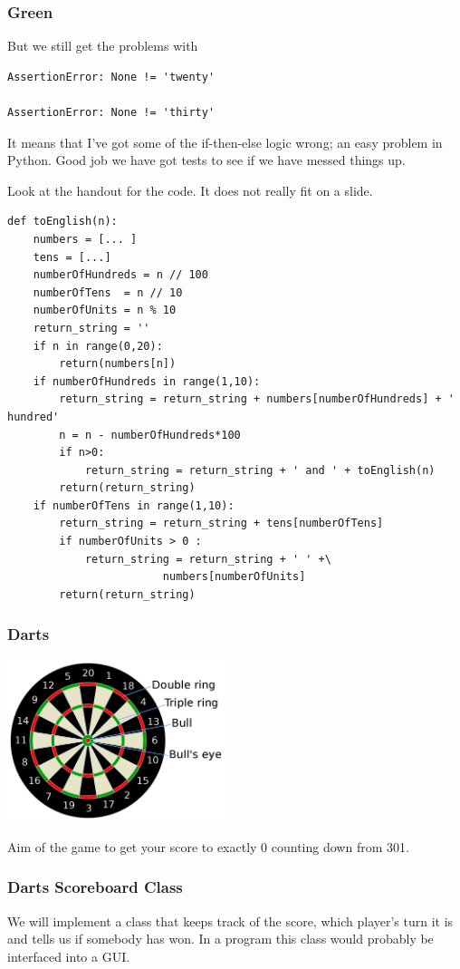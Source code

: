 \documentclass{beamer}
\begin{document}
\begin{frame}[fragile]
  \frametitle{Green}
But we still get the problems with 
\begin{verbatim}
AssertionError: None != 'twenty'

AssertionError: None != 'thirty'
\end{verbatim}
It means that I've got some of the if-then-else logic wrong; an easy
problem in Python. Good job we have got tests to see if we have messed
things up.

Look at the handout for the code. It does not really  fit on a slide.
\end{frame}
\begin{frame}[fragile]
  \begin{lstlisting}[basicstyle=\fontsize{8}{9}\selectfont]
def toEnglish(n):
    numbers = [... ] 
    tens = [...]
    numberOfHundreds = n // 100
    numberOfTens  = n // 10
    numberOfUnits = n % 10
    return_string = ''
    if n in range(0,20):
        return(numbers[n])
    if numberOfHundreds in range(1,10):
        return_string = return_string + numbers[numberOfHundreds] + ' hundred'
        n = n - numberOfHundreds*100
        if n>0:
            return_string = return_string + ' and ' + toEnglish(n)
        return(return_string)
    if numberOfTens in range(1,10):
        return_string = return_string + tens[numberOfTens]
        if numberOfUnits > 0 :
            return_string = return_string + ' ' +\ 
            			numbers[numberOfUnits]
        return(return_string)
  \end{lstlisting}
\end{frame}
\begin{frame}
\frametitle{Darts}

\begin{center}
    \includegraphics[height=1.86in,width=2.5in]{board.png}
\end{center}
Aim of the game to get your score to exactly 0 counting down from 301. 
\end{frame}
\begin{frame}
  \frametitle{Darts Scoreboard Class}

We will implement a class that keeps track of the score, which
player's turn it is and tells us if somebody has won. In a program
this class would probably be interfaced into a GUI. 
\end{frame}
\end{document}
